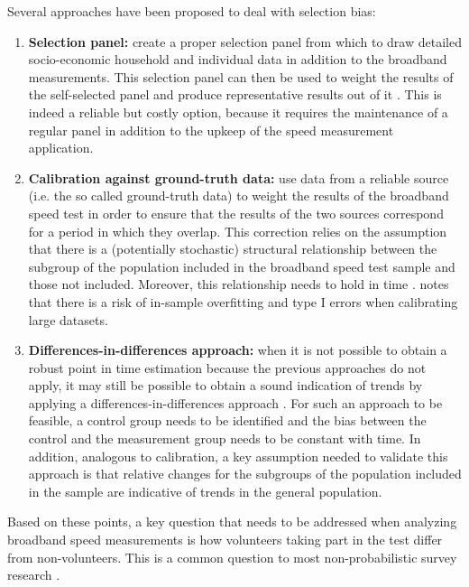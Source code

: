 \documentclass[12pt]{article}
\begin{document}
Several approaches have been proposed to deal with selection bias:

\begin{enumerate}

	\item \textbf{Selection panel:} create a proper selection panel from which to draw detailed socio-economic household and individual data in addition to the broadband measurements. This selection panel can then be used to weight the results of the self-selected panel and produce representative results out of it \citep{opt2012}. This is indeed a reliable but costly option, because it requires the maintenance of a regular panel in addition to the upkeep of the speed measurement application.
	
	\item \textbf{Calibration against ground-truth data:} use data from a reliable source (i.e. the so called ground-truth data) to weight the results of the broadband speed test in order to ensure that the results of the two sources correspond for a period in which they overlap.  This correction relies on the assumption that there is a (potentially stochastic) structural relationship between the subgroup of the population included in the broadband speed test sample and those not included. Moreover, this relationship needs to hold in time \citep{zagheni2015}. \citep{couper2013} notes that there is a risk of in-sample overfitting and type I errors when calibrating large datasets.
	
	\item \textbf{Differences-in-differences approach:} when it is not possible to obtain a robust point in time estimation because the previous approaches do not apply, it may still be possible to obtain a sound indication of trends by applying a differences-in-differences approach \citep{zagheni2015}. For such an approach to be feasible, a control group needs to be identified and the bias between the control and the measurement group needs to be constant with time. In addition, analogous to calibration, a key assumption needed to validate this approach is that relative changes for the subgroups of the population included in the sample are indicative of trends in the general population.         

\end{enumerate}  

Based on these points, a key question that needs to be addressed when analyzing broadband speed measurements is how volunteers taking part in the test differ from non-volunteers. This is a common question to most non-probabilistic survey research \citep{couper2013}. 
\end{document}
